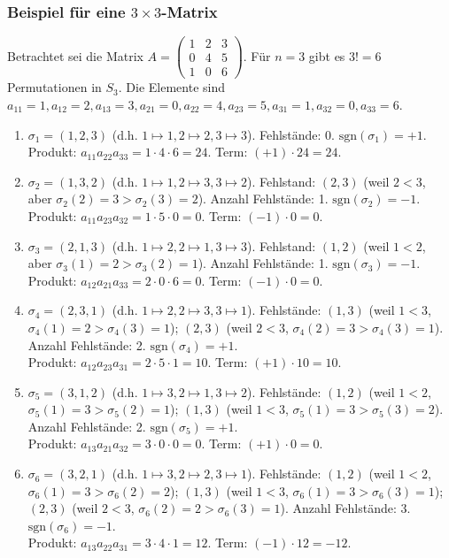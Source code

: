\subsubsection*{Beispiel für eine $3 \times 3$-Matrix}
Betrachtet sei die Matrix $A = \begin{pmatrix} 1 & 2 & 3 \\ 0 & 4 & 5 \\ 1 & 0 & 6 \end{pmatrix}$.
Für $n=3$ gibt es $3! = 6$ Permutationen in $S_3$. Die Elemente sind $a_{11}=1, a_{12}=2, a_{13}=3, a_{21}=0, a_{22}=4, a_{23}=5, a_{31}=1, a_{32}=0, a_{33}=6$.

\begin{enumerate}
    \item $\sigma_1 = (1,2,3)$ (d.h. $1 \mapsto 1, 2 \mapsto 2, 3 \mapsto 3$). Fehlstände: 0. $\text{sgn}(\sigma_1)=+1$. \\
          Produkt: $a_{11}a_{22}a_{33} = 1 \cdot 4 \cdot 6 = 24$. Term: $(+1) \cdot 24 = 24$.
    \item $\sigma_2 = (1,3,2)$ (d.h. $1 \mapsto 1, 2 \mapsto 3, 3 \mapsto 2$). Fehlstand: $(2,3)$ (weil $2<3$, aber $\sigma_2(2)=3 > \sigma_2(3)=2$). Anzahl Fehlstände: 1. $\text{sgn}(\sigma_2)=-1$. \\
          Produkt: $a_{11}a_{23}a_{32} = 1 \cdot 5 \cdot 0 = 0$. Term: $(-1) \cdot 0 = 0$.
    \item $\sigma_3 = (2,1,3)$ (d.h. $1 \mapsto 2, 2 \mapsto 1, 3 \mapsto 3$). Fehlstand: $(1,2)$ (weil $1<2$, aber $\sigma_3(1)=2 > \sigma_3(2)=1$). Anzahl Fehlstände: 1. $\text{sgn}(\sigma_3)=-1$. \\
          Produkt: $a_{12}a_{21}a_{33} = 2 \cdot 0 \cdot 6 = 0$. Term: $(-1) \cdot 0 = 0$.
    \item $\sigma_4 = (2,3,1)$ (d.h. $1 \mapsto 2, 2 \mapsto 3, 3 \mapsto 1$). Fehlstände: $(1,3)$ (weil $1<3$, $\sigma_4(1)=2 > \sigma_4(3)=1$); $(2,3)$ (weil $2<3$, $\sigma_4(2)=3 > \sigma_4(3)=1$). Anzahl Fehlstände: 2. $\text{sgn}(\sigma_4)=+1$. \\
          Produkt: $a_{12}a_{23}a_{31} = 2 \cdot 5 \cdot 1 = 10$. Term: $(+1) \cdot 10 = 10$.
    \item $\sigma_5 = (3,1,2)$ (d.h. $1 \mapsto 3, 2 \mapsto 1, 3 \mapsto 2$). Fehlstände: $(1,2)$ (weil $1<2$, $\sigma_5(1)=3 > \sigma_5(2)=1$); $(1,3)$ (weil $1<3$, $\sigma_5(1)=3 > \sigma_5(3)=2$). Anzahl Fehlstände: 2. $\text{sgn}(\sigma_5)=+1$. \\
          Produkt: $a_{13}a_{21}a_{32} = 3 \cdot 0 \cdot 0 = 0$. Term: $(+1) \cdot 0 = 0$.
    \item $\sigma_6 = (3,2,1)$ (d.h. $1 \mapsto 3, 2 \mapsto 2, 3 \mapsto 1$). Fehlstände: $(1,2)$ (weil $1<2$, $\sigma_6(1)=3 > \sigma_6(2)=2$); $(1,3)$ (weil $1<3$, $\sigma_6(1)=3 > \sigma_6(3)=1$); $(2,3)$ (weil $2<3$, $\sigma_6(2)=2 > \sigma_6(3)=1$). Anzahl Fehlstände: 3. $\text{sgn}(\sigma_6)=-1$. \\
          Produkt: $a_{13}a_{22}a_{31} = 3 \cdot 4 \cdot 1 = 12$. Term: $(-1) \cdot 12 = -12$.
\end{enumerate}
